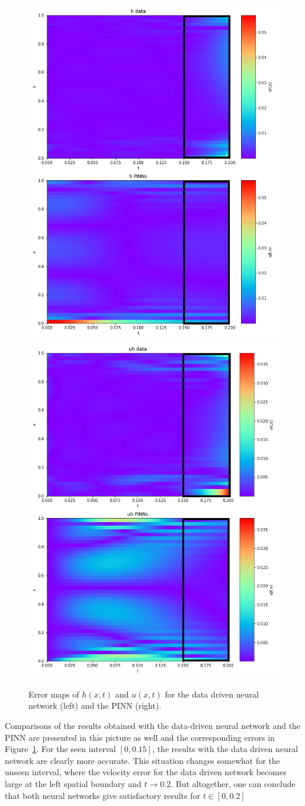 \begin{figure}[t!]
\begin{center}
\includegraphics[width=0.45\linewidth]{../Code/B2/plots/h_errorplot_b1.png}
\includegraphics[width=0.45\linewidth]{../Code/B2/plots/uh_errorplot_b1.png}
\end{center}
\caption{
Error maps of $h(x, t)$ and $u(x,t)$ for the data driven neural network (left) and the PINN (right).}\label{fig:b1_swe_errors}
\end{figure}

Comparisons of the results obtained with the data-driven neural network and the PINN are presented
in this picture as well and the corresponding errors in Figure~\ref{fig:b1_swe_errors}. For the 
seen interval $[0,0.15]$, the results with the data driven neural network are clearly 
more accurate. This situation changes somewhat for the unseen interval, where the velocity error
for the data driven network becomes large at the left spatial boundary and $t\to 0.2$. But altogether, 
one can conclude that both neural networks give satisfactory results for $t\in[0,0.2]$


